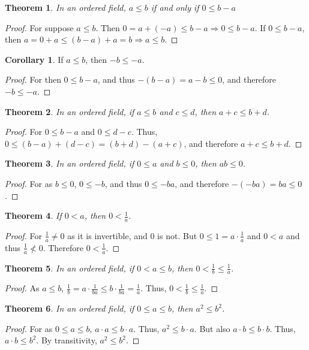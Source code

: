 \documentclass[oneside]{book}
\newtheorem{theorem}{Theorem}[section]
\theoremstyle{definition}
\newtheorem{corollary}{Corollary}[section]
\begin{document}
\begin{theorem}
In an ordered field, $a\leq b$ if and only if $0 \leq b-a$
\end{theorem}
\begin{proof}
For suppose $a\leq b$. Then $0=a+(-a)\leq b-a\Rightarrow 0 \leq b-a$. If $0\leq b-a$, then $a=0+a \leq (b-a)+a = b\Rightarrow a\leq b$.
\end{proof}

\begin{corollary}
If $a\leq b$, then $-b\leq -a$.
\end{corollary}
\begin{proof}
For then $0 \leq b-a$, and thus $-(b-a)=a-b\leq 0$, and therefore $-b \leq -a$.
\end{proof}

\begin{theorem}
In an ordered field, if $a\leq b$ and $c\leq d$, then $a+c \leq b+d$.
\end{theorem}
\begin{proof}
For $0\leq b-a$ and $0\leq d-c$. Thus, $0\leq (b-a)+(d-c)= (b+d)-(a+c)$, and therefore $a+c \leq b+d$.
\end{proof}

\begin{theorem}
In an ordered field, if $0\leq a$ and $b\leq 0$, then $ab\leq 0$.
\end{theorem}
\begin{proof}
For as $b\leq 0$, $0\leq -b$, and thus $0\leq -ba$, and therefore $-(-ba) = ba \leq 0$.
\end{proof}

\begin{theorem}
If $0< a$, then $0<\frac{1}{a}$.
\end{theorem}
\begin{proof}
For $\frac{1}{a}\ne 0$ as it is invertible, and $0$ is not. But $0\leq1=a\cdot \frac{1}{a}$ and $0<a$ and thus $\frac{1}{a} \not <0$. Therefore $0<\frac{1}{a}$.
\end{proof}

\begin{theorem}
In an ordered field, if $0<a\leq b$, then $0<\frac{1}{b}\leq\frac{1}{a}$.
\end{theorem}
\begin{proof}
As $a\leq b$, $\frac{1}{b}=a\cdot \frac{1}{ba} \leq b\cdot \frac{1}{ba}=\frac{1}{a}$. Thus, $0< \frac{1}{b}\leq \frac{1}{a}$.
\end{proof}

\begin{theorem}
In an ordered field, if $0 \leq a \leq b$, then $a^2 \leq b^2$.
\end{theorem}
\begin{proof}
For as $0\leq a \leq b$, $a\cdot a \leq b\cdot a$. Thus, $a^2 \leq b \cdot a$. But also $a\cdot b \leq b\cdot b$. Thus, $a\cdot b \leq b^2$. By transitivity, $a^2 \leq b^2$.
\end{proof}
\end{document}
